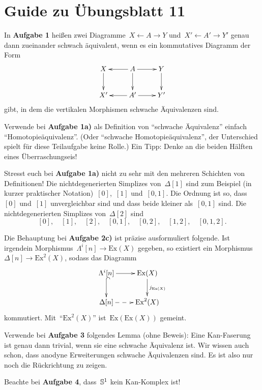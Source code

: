 \documentclass{uebblatt}
\begin{document}
\section*{Guide zu Übungsblatt 11}

In \textbf{Aufgabe 1} heißen zwei Diagramme~$X \leftarrow A \rightarrow Y$
und~$X' \leftarrow A' \rightarrow Y'$ genau dann zueinander schwach äquivalent,
wenn es ein kommutatives Diagramm der Form
\[ \xymatrix{
  X \ar[d] & A \ar[l]\ar[r] \ar[d] & Y \ar[d] \\
  X' & A' \ar[l]\ar[r] & Y'
} \]
gibt, in dem die vertikalen Morphismen schwache Äquivalenzen sind.

Verwende bei \textbf{Aufgabe 1a)} als Definition von "`schwache Äquivalenz"'
einfach "`Homotopieäquivalenz"'. (Oder "`schwache Homotopieäquivalenz"', der
Unterschied spielt für diese Teilaufgabe keine Rolle.) Ein Tipp: Denke an die
beiden Hälften eines Überraschungseis!

Stresst euch bei \textbf{Aufgabe 1a)} nicht zu sehr mit den mehreren Schichten
von Definitionen! Die nichtdegenerierten Simplizes von~$\Delta[1]$ sind zum
Beispiel (in kurzer praktischer Notation)~$[0]$,~$[1]$ und~$[0,1]$. Die Ordnung ist
so, dass~$[0]$ und~$[1]$ unvergleichbar sind und dass beide kleiner als~$[0,1]$
sind. Die nichtdegenerierten Simplizes von~$\Delta[2]$ sind
\[
  [0], \quad
  [1], \quad
  [2], \quad
  [0,1], \quad
  [0,2], \quad
  [1,2], \quad
  [0,1,2].
\]

Die Behauptung bei \textbf{Aufgabe 2c)} ist präzise ausformuliert folgende. Ist
irgendein Morphismus~$\Lambda^i[n] \to \mathrm{Ex}(X)$ gegeben, so existiert
ein Morphismus~$\Delta[n] \to \mathrm{Ex}^2(X)$, sodass das Diagramm
\[ \xymatrix{
  \Lambda^i[n] \ar[r] \ar@{^{(}->}[d] & \mathrm{Ex}(X) \ar[d]^{j_{\mathrm{Ex}(X)}} \\
  \Delta[n] \ar@{-->}[r] & \mathrm{Ex}^2(X)
} \]
kommutiert. Mit~"`$\mathrm{Ex}^2(X)$"' ist~$\mathrm{Ex}(\mathrm{Ex}(X))$ gemeint.

Verwende bei \textbf{Aufgabe 3} folgendes Lemma (ohne Beweis): Eine
Kan-Faserung ist genau dann trivial, wenn sie eine schwache Äquivalenz ist.
Wir wissen auch schon, dass anodyne Erweiterungen schwache Äquivalenzen sind.
Es ist also nur noch die Rückrichtung zu zeigen.

Beachte bei \textbf{Aufgabe 4}, dass~$\mathbb{S}^1$ kein Kan-Komplex ist!
\end{document}
